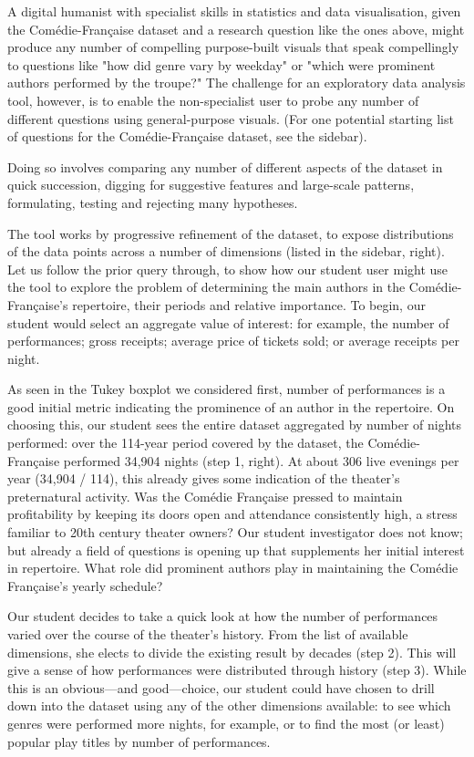 \documentclass[	DIV=calc,%
							paper=a4,%
							fontsize=11pt,%
							twocolumn]{scrartcl}	 					%
\begin{document}
A digital humanist with specialist skills in statistics and data visualisation, given the Comédie-Française dataset and a research question like the ones above, might produce any number of compelling purpose-built visuals that speak compellingly to questions like "how did genre vary by weekday" or "which were prominent authors performed by the troupe?"  The challenge for an exploratory data analysis tool, however, is to enable the non-specialist user to probe any number of different questions using general-purpose visuals.  (For one potential starting list of questions for the Comédie-Française dataset, see the sidebar).

Doing so involves comparing any number of different aspects of the dataset in quick succession, digging for suggestive features and large-scale patterns, formulating, testing and rejecting many hypotheses.

The tool works by progressive refinement of the dataset, to expose distributions of the data points across a number of dimensions (listed in the sidebar, right).  Let us follow the prior query through, to show how our student user might use the tool to explore the problem of determining the main authors in the Comédie-Française’s repertoire, their periods and relative importance.  To begin, our student would select an aggregate value of interest: for example, the number of performances; gross receipts; average price of tickets sold; or average receipts per night.

As seen in the Tukey boxplot we considered first, number of performances is a good initial metric indicating the prominence of an author in the repertoire.  On choosing this, our student sees the entire dataset aggregated by number of nights performed: over the 114-year period covered by the dataset, the Comédie-Française performed 34,904 nights (step 1, right).  At about 306 live evenings per year (34,904 / 114), this already gives some indication of the theater’s preternatural activity.  Was the Comédie Française pressed to maintain profitability by keeping its doors open and attendance consistently high, a stress familiar to 20th century theater owners?  Our student investigator does not know; but already a field of questions is opening up that supplements her initial interest in repertoire.  What role did prominent authors play in maintaining the Comédie Française’s yearly schedule?

Our student decides to take a quick look at how the number of performances varied over the course of the theater’s history.  From the list of available dimensions, she elects to divide the existing result by decades (step 2).  This will give a sense of how performances were distributed through history (step 3).  While this is an obvious—and good—choice, our student could have chosen to drill down into the dataset using any of the other dimensions available: to see which genres were performed more nights, for example, or to find the most (or least) popular play titles by number of performances.
\end{document}
